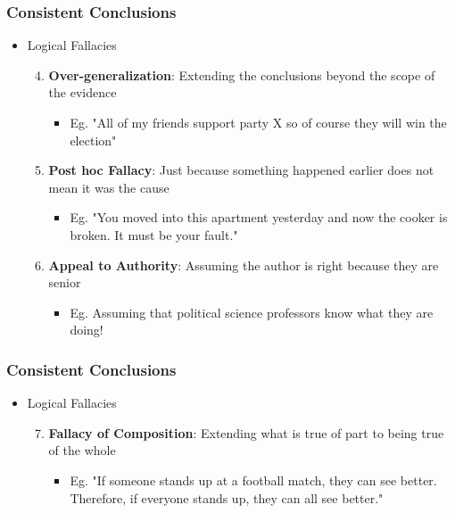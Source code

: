 \documentclass[xcolor=x11names,compress]{beamer}\usepackage[]{graphicx}\usepackage[]{color}
\renewcommand{\(}{\begin{columns}}
\renewcommand{\)}{\end{columns}}
\newcommand{\<}[1]{\begin{column}{#1}}
\renewcommand{\>}{\end{column}}
\begin{document}
\begin{frame}
\frametitle{Consistent Conclusions}
\begin{itemize}
\item Logical Fallacies
\pause
\begin{enumerate}
\setcounter{enumi}{3}
\item \textbf{Over-generalization}: Extending the conclusions beyond the scope of the evidence
\begin{itemize}
\item Eg. "All of my friends support party X so of course they will win the election"
\pause
\end{itemize}
\item \textbf{Post hoc Fallacy}: Just because something happened earlier does not mean it was the cause
\begin{itemize}
\item Eg. "You moved into this apartment yesterday and now the cooker is broken. It must be your fault."
\pause
\end{itemize}
\item \textbf{Appeal to Authority}: Assuming the author is right because they are senior
\begin{itemize}
\item Eg. Assuming that political science professors know what they are doing!
\end{itemize}
\end{enumerate}
\end{itemize}
\end{frame}

\begin{frame}
\frametitle{Consistent Conclusions}
\begin{itemize}
\item Logical Fallacies
\begin{enumerate}
\setcounter{enumi}{6}
\item \textbf{Fallacy of Composition}: Extending what is true of part to being true of the whole
\pause
\begin{itemize}
\item Eg. "If someone stands up at a football match, they can see better. Therefore, if everyone stands up, they can all see better."
\end{itemize}
\end{enumerate}
\end{itemize}
\end{frame}
\end{document}
